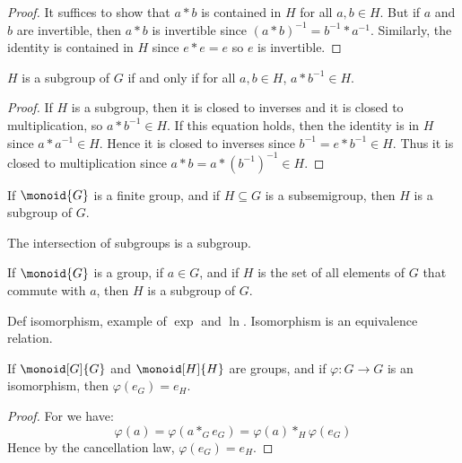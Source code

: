        \begin{proof}
            It suffices to show that $a*b$ is contained in $H$ for all
            $a,b\in{H}$. But if $a$ and $b$ are invertible, then $a*b$ is
            invertible since
            $(a*b)^{\minus{1}}=b^{\minus{1}}*a^{\minus{1}}$. Similarly, the
            identity is contained in $H$ since $e*e=e$ so $e$ is invertible.
        \end{proof}
        \begin{theorem}
            $H$ is a subgroup of $G$ if and only if for all $a,b\in{H}$,
            $a*b^{\minus{1}}\in{H}$.
        \end{theorem}
        \begin{proof}
            If $H$ is a subgroup, then it is closed to inverses and it is
            closed to multiplication, so $a*b^{\minus{1}}\in{H}$. If this
            equation holds, then the identity is in $H$ since
            $a*a^{\minus{1}}\in{H}$. Hence it is closed to inverses since
            $b^{\minus{1}}=e*b^{\minus{1}}\in{H}$. Thus it is closed to
            multiplication since $a*b=a*(b^{\minus{1}})^{\minus{1}}\in{H}$.
        \end{proof}
        \begin{theorem}
            If $\monoid{G}$ is a finite group, and if $H\subseteq{G}$ is a
            subsemigroup, then $H$ is a subgroup of $G$.
        \end{theorem}
        \begin{theorem}
            The intersection of subgroups is a subgroup.
        \end{theorem}
        \begin{theorem}
            If $\monoid{G}$ is a group, if $a\in{G}$, and if $H$ is the set
            of all elements of $G$ that commute with $a$, then $H$ is a
            subgroup of $G$.
        \end{theorem}
        Def isomorphism, example of $\exp$ and $\ln$. Isomorphism is an
        equivalence relation.
        \begin{theorem}
            If $\monoid[G]{G}$ and $\monoid[H]{H}$ are groups, and if
            $\varphi:G\rightarrow{G}$ is an isomorphism, then
            $\varphi(e_{G})=e_{H}$.
        \end{theorem}
        \begin{proof}
            For we have:
            \begin{equation}
                \varphi(a)=\varphi(a*_{G}e_{G})
                          =\varphi(a)*_{H}\varphi(e_{G})
            \end{equation}
            Hence by the cancellation law, $\varphi(e_{G})=e_{H}$.
        \end{proof}
